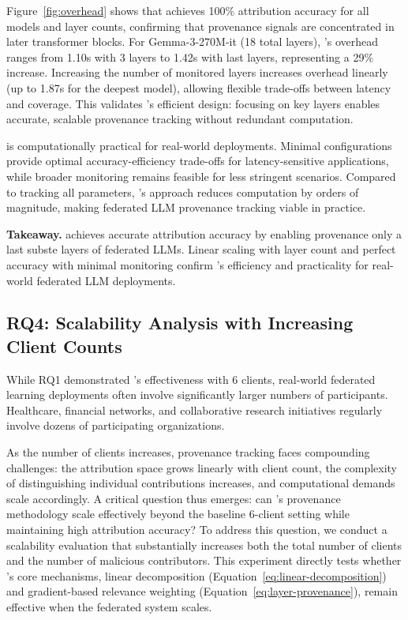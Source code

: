 Figure~\ref{fig:overhead} shows that \tool achieves 100\% attribution accuracy for all models and layer counts, confirming that provenance signals are concentrated in later transformer blocks.  For Gemma-3-270M-it (18 total layers), \tool's overhead ranges from 1.10s with 3 layers to 1.42s with last layers, representing a 29\% increase.
Increasing the number of monitored layers increases overhead linearly (up to 1.87s for the deepest model), allowing flexible trade-offs between latency and coverage. 
This validates \tool's efficient design: focusing on key layers enables accurate, scalable provenance tracking without redundant computation.


\tool is computationally practical for real-world deployments. 
Minimal configurations provide optimal accuracy-efficiency trade-offs for latency-sensitive applications, while broader monitoring remains feasible for less stringent scenarios. 
Compared to tracking all parameters, \tool's approach reduces computation by orders of magnitude, making federated LLM provenance tracking viable in practice.

\begin{tcolorbox}[colback=white, colframe=black,  left=0pt, right=0pt, top=0pt, bottom=0pt]
  \textbf{Takeaway.} \tool achieves accurate attribution accuracy by enabling provenance only a last subste layers of federated LLMs. Linear scaling with layer count and perfect accuracy with minimal monitoring confirm \tool's efficiency and practicality for real-world federated LLM deployments.
\end{tcolorbox}



\subsection{RQ4: Scalability Analysis with Increasing Client Counts}

While RQ1 demonstrated \tool's effectiveness with 6 clients, real-world federated learning deployments often involve significantly larger numbers of participants.
Healthcare, financial networks, and collaborative research initiatives regularly involve dozens of participating organizations.

As the number of clients increases, provenance tracking faces compounding challenges: the attribution space grows linearly with client count, the complexity of distinguishing individual contributions increases, and computational demands scale accordingly.
A critical question thus emerges: can \tool's provenance methodology scale effectively beyond the baseline 6-client setting while maintaining high attribution accuracy?
To address this question, we conduct a scalability evaluation that substantially increases both the total number of clients and the number of malicious contributors.
This experiment directly tests whether \tool's core mechanisms, linear decomposition (Equation~\ref{eq:linear-decomposition}) and gradient-based relevance weighting (Equation~\ref{eq:layer-provenance}), remain effective when the federated system scales.

